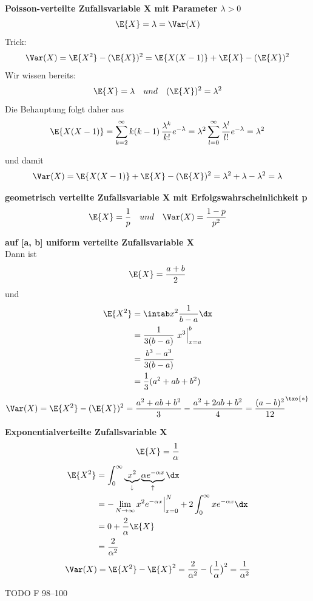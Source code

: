 \begin{bsp}
    \textbf{Poisson-verteilte Zufallsvariable X mit Parameter $\lambda > 0$} 
    \[
        \E{X} = \lambda = \Var(X)
    \]
    Trick:
    \[
        \Var(X) = \E{X^2} - (\E{X})^2 = \E{X(X-1)} + \E{X} - (\E{X})^2
    \]
    Wir wissen bereits:
    \[
        \E{X} = \lambda \quad und \quad  (\E{X})^2 = \lambda^2
    \]
    Die Behauptung folgt daher aus
    \[
        \E{X(X-1)}
        = \sum_{k=2}^{\infty} k(k-1)\,\frac{\lambda^k}{k!} e^{-\lambda}
        = \lambda^2 \sum_{l=0}^{\infty} \frac{\lambda^l}{l!} e^{-\lambda}
        = \lambda^2
    \]

    und damit
    \[
        \Var(X)
        = \E{X(X-1)} + \E{X} - (\E{X})^2
        = \lambda^2 + \lambda - \lambda^2
        = \lambda
    \]
\end{bsp}

\begin{bsp}
    \textbf{geometrisch verteilte Zufallsvariable X mit Erfolgswahrscheinlichkeit p}   \\
    \[
        \E{X} = \frac{1}{p} \quad und \quad \Var(X) = \frac{1-p}{p^2}
    \]
\end{bsp}

\begin{bsp}
    \textbf{auf [a, b] uniform verteilte Zufallsvariable X}   \\
    Dann ist
    \[
        \E{X} = \frac{a + b}{2}
    \]
    und
    \begin{align*}
        \E{X^2}&  = \intab x^2 \frac{1}{b - a} \dx \\
        &= \frac{1}{3(b - a)} \ x^3 \Big|_{x=a}^b \\
        &= \frac{b^3 - a^3}{3(b - a)} \\
        &= \frac{1}{3}(a^2 + ab + b^2)
    \end{align*}
    \[
        \Var(X) = \E{X^2} - (\E{X})^2
        = \frac{a^2 + ab + b^2}{3} - \frac{a^2 + 2ab + b^2}{4}
        = \frac{(a - b)^2}{12}^{\txo{*}}
    \]
\end{bsp}

\begin{bsp}
    \textbf{Exponentialverteilte Zufallsvariable X} 
    \[
        \E{X} = \frac{1}{\alpha}
    \]
    \begin{align*}
        \E{X^2}  & = \int^{\infty}_0 \underbrace{x^2}_{\downarrow} \underbrace{\alpha e^{- \alpha x}}_{\uparrow} \dx \\
        & = - \lim_{N \rightarrow \infty} x^2 e^{- \alpha x} \Big|_{x=0}^N + 2 \int_0^{\infty} x e^{- \alpha x} \dx \\
        & = 0 + \frac{2}{\alpha} \E{X} \\
        & = \frac{2}{\alpha^2}
    \end{align*}
    \[
        \Var(X) = \E{X^2} - \E{X}^2 =  \frac{2}{\alpha^2} - \big( \frac{1}{\alpha} \big)^2 =  \frac{1}{\alpha^2}
    \]
\end{bsp}


\begin{satz} 
TODO F 98--100 %
\end{satz}

